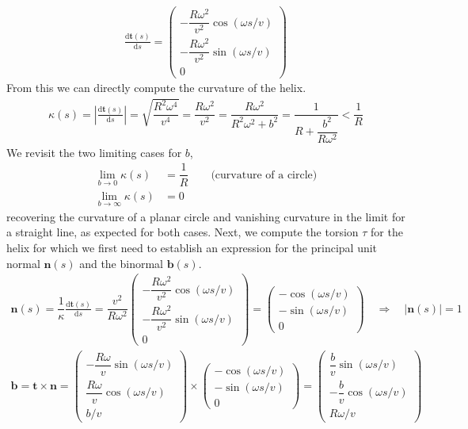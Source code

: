 \documentclass[11pt, DINA4, fleqn]{amsart}
\def\df{\mathrm{d}\xspace}
\newcommand{\dd}[2]{\frac{\df#1}{\df#2}}
\def\vt{\boldsymbol{t}\xspace}
\def\vn{\boldsymbol{n}\xspace}
\def\vb{\boldsymbol{b}\xspace}
\begin{document}
\begin{align}
\dd{\vt(s)}{s} =\begin{pmatrix}
-\dfrac{R\omega^2}{v^2}\cos(\omega s/v) \\
-\dfrac{R\omega^2}{v^2}\sin(\omega s/v) \\
0
\end{pmatrix}
\end{align}
From this we can directly compute the curvature of the helix.
\begin{align}
\kappa(s) = \left|\dd{\vt(s)}{s}\right| = \sqrt{\dfrac{R^2\omega^4}{v^4}} = \dfrac{R\omega^2}{v^2} = \dfrac{R\omega^2}{R^2\omega^2 + b^2} = \dfrac{1}{R + \dfrac{b^2}{R\omega^2}} < \dfrac{1}{R}
\end{align}
We revisit the two limiting cases for $b$,
\begin{align}
\lim_{b\rightarrow 0} \kappa(s) &= \dfrac{1}{R} \qquad \text{(curvature of a circle)} \\
\lim_{b\rightarrow \infty} \kappa(s) &= 0
\end{align}
recovering the curvature of a planar circle and vanishing curvature in the limit for a straight line, as expected for both cases.
Next, we compute the torsion $\tau$ for the helix for which we first need to establish an expression for the principal unit normal $\vn(s)$ and the binormal $\vb(s)$.
\begin{align}
\vn(s) = \dfrac{1}{\kappa} \dd{\vt(s)}{s} = \dfrac{v^2}{R\omega^2}
\begin{pmatrix}
-\dfrac{R\omega^2}{v^2}\cos(\omega s/v) \\
-\dfrac{R\omega^2}{v^2}\sin(\omega s/v) \\
0
\end{pmatrix} =
\begin{pmatrix}
-\cos(\omega s/v) \\
-\sin(\omega s/v) \\
0
\end{pmatrix} \quad \Longrightarrow \quad |\vn(s)| = 1
\end{align}
\begin{align}
\vb = \vt \times \vn = 
\begin{pmatrix}
-\dfrac{R\omega}{v}\sin(\omega s/v) \\
\dfrac{R\omega}{v}\cos(\omega s/v) \\
b/v
\end{pmatrix}
\times
\begin{pmatrix}
-\cos(\omega s/v) \\
-\sin(\omega s/v) \\
0
\end{pmatrix}
=\begin{pmatrix}
\dfrac{b}{v}\sin(\omega s/v) \\
-\dfrac{b}{v}\cos(\omega s/v) \\
R\omega/v
\end{pmatrix}
\end{align}
\end{document}
